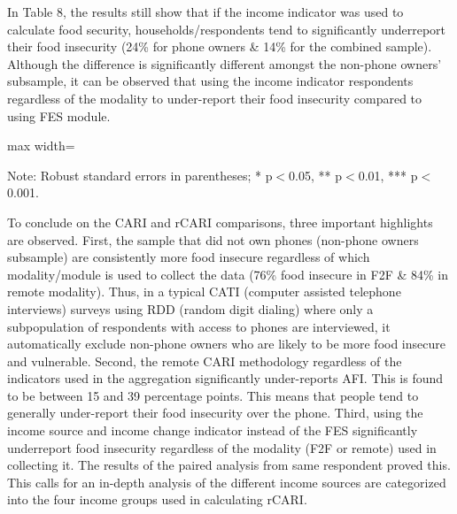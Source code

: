 \documentclass[11pt,harvard]{article}
\begin{document}
In Table 8, the results still show that if the income indicator was used to calculate food security, households/respondents tend to significantly underreport their food insecurity (24\% for phone owners \& 14\% for the combined sample). Although the difference is significantly different amongst the non-phone owners' subsample, it can be observed that using the income indicator respondents regardless of the modality to under-report their food insecurity compared to using FES module. 

\begin{table}[htbp]
	\centering
	\begin{adjustbox}{max width=\textwidth}
		\begin{threeparttable}
			\caption{Impact of Indicator Composition: CARI-FES vs. CARI-Inc in Remote Surveys (Paired)}
			\scriptsize
			 
			\label{tab:CAR_RM_Paired_ttest_Full}
			\begin{tablenotes}
				\item Note: Robust standard errors in parentheses; * p$<$0.05, ** p$<$0.01, *** p$<$0.001. 
			\end{tablenotes}
		\end{threeparttable}
	\end{adjustbox}
\end{table}

To conclude on the CARI and rCARI comparisons, three important highlights are observed. First, the sample that did not own phones (non-phone owners subsample) are consistently more food insecure regardless of which modality/module is used to collect the data (76\% food insecure in F2F \& 84\% in remote modality). Thus, in a typical CATI (computer assisted telephone interviews) surveys using RDD (random digit dialing) where only a subpopulation of respondents with access to phones are interviewed, it automatically exclude non-phone owners who are likely to be more food insecure and vulnerable. Second, the remote CARI methodology regardless of the indicators used in the aggregation significantly under-reports AFI. This is found to be between 15 and 39 percentage points. This means that people tend to generally under-report their food insecurity over the phone. Third, using the income source and income change indicator instead of the FES significantly underreport food insecurity regardless of the modality (F2F or remote) used in collecting it. The results of the paired analysis from same respondent proved this. This calls for an in-depth analysis of the different income sources are categorized into the four income groups used in calculating rCARI. 
\end{document}
